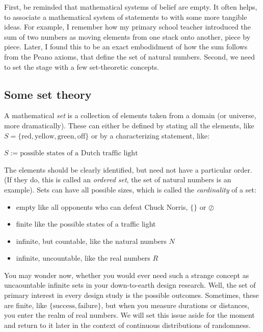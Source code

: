 \documentclass[]{svmono}
\providecommand{\tightlist}{%
  \setlength{\itemsep}{0pt}\setlength{\parskip}{0pt}}
\theoremstyle{definition}
\theoremstyle{definition}
\theoremstyle{definition}
\theoremstyle{remark}
\begin{document}
First, be reminded that mathematical systems of belief are empty. It
often helps, to associate a mathematical system of statements to with
some more tangible ideas. For example, I remember how my primary school
teacher introduced the sum of two numbers as moving elements from one
stack onto another, piece by piece. Later, I found this to be an exact
embodidment of how the sum follows from the Peano axioms, that define
the set of natural numbers. Second, we need to set the stage with a few
set-theoretic concepts.

\subsection{Some set theory}\label{some-set-theory}

A mathematical \emph{set} is a collection of elements taken from a
domain (or universe, more dramatically). These can either be defined by
stating all the elements, like
\(S = \{\textrm{red}, \textrm{yellow}, \textrm{green}, \textrm{off}\}\)
or by a characterizing statement, like:

\(S := \textrm{possible states of a Dutch traffic light}\)

The elements should be clearly identified, but need not have a
particular order. (If they do, this is called an \emph{ordered set}, the
set of natural numbers is an example). Sets can have all possible sizes,
which is called the \emph{cardinality} of a set:

\begin{itemize}
\tightlist
\item
  empty like all opponents who can defeat Chuck Norris, \(\{\}\) or
  \(\oslash\)
\item
  finite like the possible states of a traffic light
\item
  infinite, but countable, like the natural numbers \(N\)
\item
  infinite, uncountable, like the real numbers \(R\)
\end{itemize}

You may wonder now, whether you would ever need such a strange concept
as uncaountable infinite sets in your down-to-earth design research.
Well, the set of primary interest in every design study is the possible
outcomes. Sometimes, these are finite, like
\(\{\textrm{success}, \textrm{failure}\}\), but when you measure
durations or distances, you enter the realm of real numbers. We will set
this issue aside for the moment and return to it later in the context of
continuous distributions of randomness.
\end{document}
